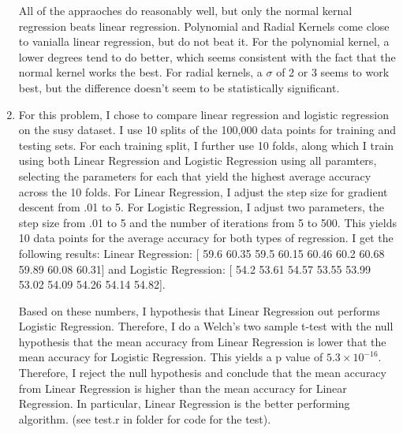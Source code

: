 \documentclass[12pt]{article}
\theoremstyle{plain}
\theoremstyle{definition}
\begin{document}
\begin{enumerate}
All of the appraoches do reasonably well, but only the normal kernal regression beats linear regression. Polynomial and Radial Kernels come close to vanialla linear regression, but do not beat it. For the polynomial kernel, a lower degrees tend to do better, which seems consistent with the fact that the normal kernel works the best. For radial kernels, a $\sigma$ of 2 or 3 seems to work best, but the difference doesn't seem to be statistically significant. 


\vspace{3pc}
\item
For this problem, I chose to compare linear regression and logistic regression on the susy dataset. I use 10 splits of the 100,000 data points for training and testing sets. For each training split, I further use 10 folds, along which I train using both Linear Regression and Logistic Regression using all paramters, selecting the parameters for each that yield the highest average accuracy across the 10 folds. For Linear Regression, I adjust the step size for gradient descent from .01 to 5. For Logistic Regression, I adjust two parameters, the step size from .01 to 5 and the number of iterations from 5 to 500. This yields 10 data points for the average accuracy for both types of regression. I get the following results: Linear Regression: [ 59.6   60.35  59.5   60.15  60.46  60.2   60.68  59.89  60.08  60.31] and Logistic Regression:  [ 54.2   53.61  54.57  53.55  53.99  53.02  54.09  54.26  54.14  54.82]. 

Based on these numbers, I hypothesis that Linear Regression out performs Logistic Regression. Therefore, I do a Welch's two sample t-test with the null hypothesis that the mean accuracy from Linear Regression is lower that the mean accuracy for Logistic Regression. This yields a p value of $5.3 \times 10^{-16}$. Therefore, I reject the null hypothesis and conclude that the mean accuracy from Linear Regression is higher than the mean accuracy for Linear Regression. In particular, Linear Regression is the better performing algorithm. (see test.r in folder for code for the test). 






\end{enumerate}
\end{document}
